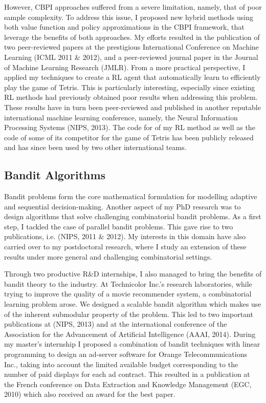 However, CBPI approaches suffered from a severe limitation, namely, that of poor sample complexity. To address this issue, I proposed new hybrid methods using both value function and policy approximations in the CBPI framework, that leverage the benefits of both approaches. My efforts resulted in the publication of two peer-reviewed papers at the prestigious International Conference on Machine Learning (ICML 2011 \& 2012), and a peer-reviewed journal paper in the Journal of Machine Learning Research (JMLR). From a more practical perspective, I applied my techniques to create a RL agent that automatically learn to efficiently play the game of Tetris. This is particularly interesting, especially since existing RL methods had previously obtained poor results when addressing this problem. These results have in turn been peer-reviewed and published in another reputable international machine learning conference, namely, the Neural Information Processing Systems (NIPS, 2013). The code for of my  RL method as well as the code of some of its competitor for the game of Tetris has been publicly released and has since been used by two other international teams.
\subsection{Bandit Algorithms}
Bandit problems form the core mathematical formulation for modelling adaptive and sequential decision-making. Another aspect of my PhD research was to design algorithms that solve challenging combinatorial bandit problems. As a first step, I tackled the case of parallel bandit problems. This gave rise to two publications, i.e. (NIPS, 2011 \& 2012). My interests in this domain have also carried over to my postdoctoral research, where I study an extension of these results under more general and challenging combinatorial settings. 

Through two productive R\&D internships, I also managed to bring the benefits of bandit theory to the industry. 
At Technicolor Inc.'s research laboratories, while trying to improve the quality of a movie recommender system, a combinatorial learning problem arose. We designed a scalable bandit algorithm which makes use of the inherent submodular property of the problem. This led to two important publications at (NIPS, 2013) and at the international conference of the Association for the Advancement of Artificial Intelligence (AAAI, 2014). During my master's internship I proposed a combination of bandit techniques with linear programming to design an ad-server software for Orange Telecommunications Inc., taking into account the limited available budget corresponding to the number of paid displays for each ad contract. This resulted in a publication at the 
French conference on Data Extraction and Knowledge Management (EGC, 2010) which also received an award for the best paper. 


